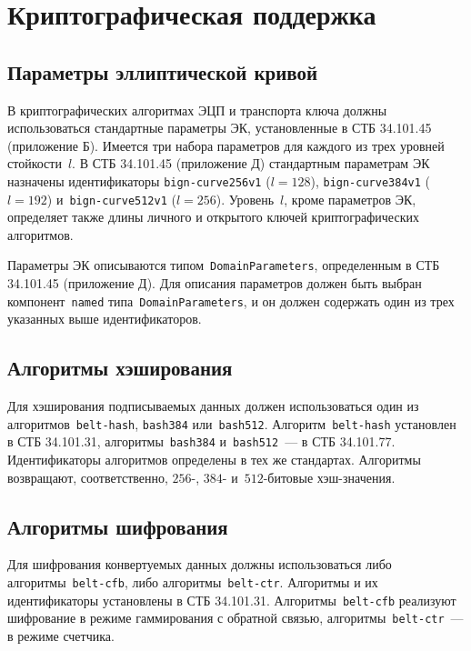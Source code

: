 \chapter{Криптографическая поддержка}\label{CRYPTO}

\section{Параметры эллиптической кривой}\label{CRYPTO.Params}

В криптографических алгоритмах ЭЦП и транспорта ключа должны
использоваться стандартные параметры ЭК, 
установленные в СТБ 34.101.45 (приложение Б). 
%
Имеется три набора параметров для каждого из трех уровней стойкости~$l$.
%
В СТБ 34.101.45 (приложение Д) стандартным параметрам ЭК назначены 
идентификаторы 
\texttt{bign-curve256v1} ($l=128$), 
\texttt{bign-curve384v1} ($l=192$)
и~\texttt{bign-curve512v1} ($l=256$).
%
Уровень~$l$, кроме параметров ЭК, определяет также длины личного и 
открытого ключей криптографических алгоритмов.

Параметры ЭК описываются типом~\texttt{DomainParameters},
определенным в СТБ 34.101.45 (приложение Д). Для описания параметров
должен быть выбран компонент~\texttt{named} типа~\texttt{DomainParameters},
и он должен содержать один из трех указанных выше идентификаторов.

\section{Алгоритмы хэширования}\label{CRYPTO.Hash}

Для хэширования подписываемых данных должен использоваться один из
алгоритмов~\texttt{belt-hash}, \texttt{bash384} или~\texttt{bash512}.
%
Алгоритм~\texttt{belt-hash} установлен в СТБ 34.101.31,
алгоритмы~\texttt{bash384} и~\texttt{bash512}~--- в СТБ 34.101.77.
%
Идентификаторы алгоритмов определены в тех же стандартах.
%
Алгоритмы возвращают, соответственно, $256$-, $384$- и~$512$-битовые 
хэш-значения.

\section{Алгоритмы шифрования}\label{CRYPTO.Encr}

Для шифрования конвертуемых данных должны использоваться либо
алгоритмы~\texttt{belt-cfb}, либо алгоритмы~\texttt{belt-ctr}.
%
Алгоритмы и их идентификаторы установлены в СТБ 34.101.31.
%
Алгоритмы~\texttt{belt-cfb} реализуют шифрование в режиме гаммирования с 
обратной связью, алгоритмы~\texttt{belt-ctr}~--- в режиме счетчика.

